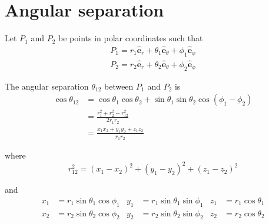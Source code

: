 

\section*{Angular separation}

Let $P_1$ and $P_2$ be points in polar coordinates such that
\begin{align*}
P_1=r_1\hat{\mathbf e}_r+\theta_1\hat{\mathbf e}_\theta+\phi_1\hat{\mathbf e}_\phi
\\
P_2=r_2\hat{\mathbf e}_r+\theta_2\hat{\mathbf e}_\theta+\phi_2\hat{\mathbf e}_\phi
\end{align*}

The angular separation $\theta_{12}$ between $P_1$ and $P_2$ is
\begin{align*}
\cos\theta_{12}
&=\cos\theta_1\cos\theta_2+\sin\theta_1\sin\theta_2\cos(\phi_1-\phi_2)
\\
&=\frac{r_1^2+r_2^2-r_{12}^2}{2r_1r_2}
\\
&=\frac{x_1x_2+y_1y_2+z_1z_2}{r_1r_2}
\end{align*}

where
\begin{equation*}
r_{12}^2=(x_1-x_2)^2+(y_1-y_2)^2+(z_1-z_2)^2
\end{equation*}

and
\begin{align*}
x_1&=r_1\sin\theta_1\cos\phi_1
&
y_1&=r_1\sin\theta_1\sin\phi_1
&
z_1&=r_1\cos\theta_1
\\
x_2&=r_2\sin\theta_2\cos\phi_2
&
y_2&=r_2\sin\theta_2\sin\phi_2
&
z_2&=r_2\cos\theta_2
\end{align*}


